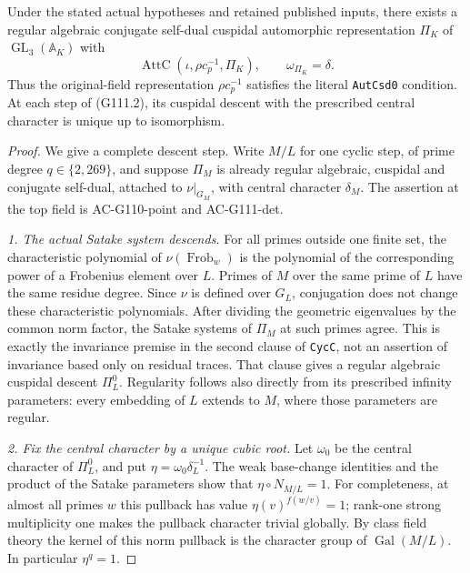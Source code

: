 \begin{theorem}
\label{AC-G111-descent}
Under the stated actual hypotheses and retained published
inputs, there exists a regular algebraic conjugate self-dual
cuspidal automorphic representation \(\Pi_K\) of
\(\operatorname{GL}_3(\mathbb A_K)\) with
\[
  \operatorname{AttC}(\iota,\rho c_p^{-1},\Pi_K),
              \qquad \omega_{\Pi_K}=\delta.
 \tag{G111.5}
\]
Thus the original-field representation \(\rho c_p^{-1}\)
satisfies the literal \texttt{AutCsd0} condition.
At each step of (G111.2), its cuspidal descent with the
prescribed central character is unique up to isomorphism.
\end{theorem}
\begin{proof}
We give a complete descent step. Write \(M/L\) for one
cyclic step, of prime degree \(q\in\{2,269\}\), and
suppose \(\Pi_M\) is already regular algebraic,
cuspidal and conjugate self-dual, attached to
\(\nu|_{G_M}\), with central character \(\delta_M\).
The assertion at the top field is AC-G110-point and
AC-G111-det.

\emph{1. The actual Satake system descends.}
For all primes outside one finite set, the characteristic
polynomial of \(\nu(\operatorname{Frob}_w)\) is the
polynomial of the corresponding power of a Frobenius
element over \(L\). Primes of \(M\) over the same prime
of \(L\) have the same residue degree. Since \(\nu\)
is defined over \(G_L\), conjugation does not change
these characteristic polynomials. After dividing the
geometric eigenvalues by the common norm factor, the
Satake systems of \(\Pi_M\) at such primes agree.
This is exactly the invariance premise in the second
clause of \texttt{CycC}, not an assertion of invariance
based only on residual traces. That clause gives a regular
algebraic cuspidal descent \(\Pi_L^0\). Regularity follows
also directly from its prescribed infinity parameters:
every embedding of \(L\) extends to \(M\), where those
parameters are regular.

\emph{2. Fix the central character by a unique cubic root.}
Let \(\omega_0\) be the central character of
\(\Pi_L^0\), and put
\(\eta=\omega_0\delta_L^{-1}\).
The weak base-change identities and the product of the
Satake parameters show that
\(\eta\circ N_{M/L}=1\). For completeness, at almost
all primes \(w\) this pullback has value
\(\eta(v)^{f(w/v)}=1\); rank-one strong multiplicity
one makes the pullback character trivial globally.
By class field theory the kernel of this norm pullback
is the character group of \(\operatorname{Gal}(M/L)\).
In particular \(\eta^q=1\).


\end{proof}
